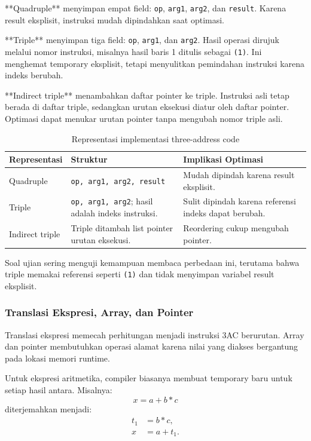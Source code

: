 **Quadruple** menyimpan empat field: \texttt{op}, \texttt{arg1}, \texttt{arg2}, dan \texttt{result}. Karena result eksplisit, instruksi mudah dipindahkan saat optimasi.

**Triple** menyimpan tiga field: \texttt{op}, \texttt{arg1}, dan \texttt{arg2}. Hasil operasi dirujuk melalui nomor instruksi, misalnya hasil baris 1 ditulis sebagai \texttt{(1)}. Ini menghemat temporary eksplisit, tetapi menyulitkan pemindahan instruksi karena indeks berubah.

**Indirect triple** menambahkan daftar pointer ke triple. Instruksi asli tetap berada di daftar triple, sedangkan urutan eksekusi diatur oleh daftar pointer. Optimasi dapat menukar urutan pointer tanpa mengubah nomor triple asli.

\begin{table}[H]
\centering
\begin{tabularx}{\textwidth}{|L{0.22\textwidth}|X|X|}
\hline
\textbf{Representasi} & \textbf{Struktur} & \textbf{Implikasi Optimasi} \\
\hline
Quadruple & \texttt{op, arg1, arg2, result} & Mudah dipindah karena result eksplisit. \\
\hline
Triple & \texttt{op, arg1, arg2}; hasil adalah indeks instruksi. & Sulit dipindah karena referensi indeks dapat berubah. \\
\hline
Indirect triple & Triple ditambah list pointer urutan eksekusi. & Reordering cukup mengubah pointer. \\
\hline
\end{tabularx}
\caption{Representasi implementasi three-address code}
\label{tab:quad-triple}
\end{table}

Soal ujian sering menguji kemampuan membaca perbedaan ini, terutama bahwa triple memakai referensi seperti \texttt{(1)} dan tidak menyimpan variabel result eksplisit.

\subsubsection{Translasi Ekspresi, Array, dan Pointer}

\begin{jawab}
Translasi ekspresi memecah perhitungan menjadi instruksi 3AC berurutan. Array dan pointer membutuhkan operasi alamat karena nilai yang diakses bergantung pada lokasi memori runtime.
\end{jawab}

Untuk ekspresi aritmetika, compiler biasanya membuat temporary baru untuk setiap hasil antara. Misalnya:
\[
    x = a + b * c
\]
diterjemahkan menjadi:
\[
\begin{aligned}
    t_1 &= b * c,\\
    x &= a + t_1.
\end{aligned}
\]

